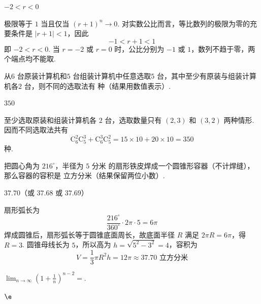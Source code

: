 \documentclass[UTF8,a4paper,oneside,11pt]{ctexbook}
\begin{document}
\begin{answer}
\(-2<r<0\)
\end{answer}

\begin{solution}
极限等于 \(1\) 当且仅当 \((r+1)^n\to0\). 对实数公比而言，等比数列的极限为零的充要条件是 \(|r+1|<1\)，因此
\[
-1<r+1<1
\]
即 \(-2<r<0\). 当 \(r=-2\) 或 \(r=0\) 时，公比分别为 \(-1\) 或 \(1\)，数列不趋于零，两个端点均不能取.
\end{solution}

\begin{problem}[A]
从\(6\text{ 台}\)原装计算机和\(5\text{ 台}\)组装计算机中任意选取\(5\text{ 台}\)，其中至少有原装与组装计算机各\(2\text{ 台}\)，则不同的选取法有\fillinblank{} 种（结果用数值表示）.
\end{problem}

\begin{answer}
\(350\)
\end{answer}

\begin{solution}
至少选取原装和组装计算机各 \(2\) 台，选取数量只有 \((2,3)\) 和 \((3,2)\) 两种情形. 因而不同选取法共有
\[
\mathrm C_6^2\mathrm C_5^3+\mathrm C_6^3\mathrm C_5^2=15\times10+20\times10=350
\]
种.
\end{solution}

\begin{problem}[A]
把圆心角为 \(216^{\circ} \)，半径为 \(5\text{ 分米}\) 的扇形铁皮焊成一个圆锥形容器（不计焊缝），那么容器的容积是\fillinblank{} \(\text{立方分米}\)（结果保留两位小数）.
\end{problem}

\begin{answer}
\(37.70\)（或 \(37.68\) 或 \(37.69\)）
\end{answer}

\begin{solution}
扇形弧长为
\[
\frac{216^{\circ}}{360^{\circ}}\cdot2\pi\cdot5=6\pi
\]
焊成圆锥后，扇形弧长等于圆锥底面周长，故底面半径 \(R\) 满足 \(2\pi R=6\pi\)，得 \(R=3\). 圆锥母线长为 \(5\)，所以高为 \(h=\sqrt{5^2-3^2}=4\)，容积为
\[
V=\frac13\pi R^2h=12\pi\approx37.70\text{ 立方分米}
\]
\end{solution}

\setcounter{probnum}{17}
\begin{problem}[B]
\(\displaystyle\lim_{n\to\infty}\left(1+\frac{1}{n}\right)^{n-2}=\)\fillinblank{}.
\end{problem}

\begin{answer}
\(\e\)
\end{answer}
\end{document}

